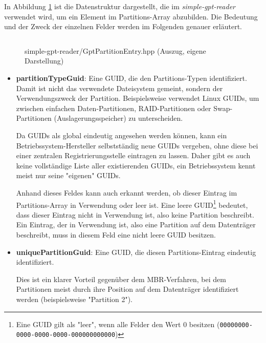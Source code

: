 In Abbildung \ref{fig:GptPartitionEntry.hpp} ist die Datenstruktur dargestellt, die im \textit{simple-gpt-reader} verwendet wird, um ein Element im Partitions-Array abzubilden.
Die Bedeutung und der Zweck der einzelnen Felder werden im Folgenden genauer erläutert.

\begin{figure}[ht]
    \inputminted[baselinestretch=1.2, tabsize=4, breaklines, frame=single]{c++}{content/code/simple-gpt-reader/GptPartitionEntry.hpp}
    
    \vspace{-0.5cm}

    \caption{simple-gpt-reader/GptPartitionEntry.hpp (Auszug, eigene Darstellung)}
    \label{fig:GptPartitionEntry.hpp}
\end{figure}

\begin{itemize}
    \item \textbf{partitionTypeGuid}:
    Eine GUID, die den Partitions-Typen identifiziert.
    Damit ist nicht das verwendete Dateisystem gemeint, sondern der Verwendungszweck der Partition.
    Beispielsweise verwendet Linux GUIDs, um zwischen einfachen Daten-Partitionen, RAID-Partitionen oder Swap-Partitionen (Auslagerungsspeicher) zu unterscheiden.
    
    Da GUIDs als global eindeutig angesehen werden können, kann ein Betriebssystem-Hersteller selbstständig neue GUIDs vergeben, ohne diese bei einer zentralen Registrierungsstelle eintragen zu lassen.
    Daher gibt es auch keine vollständige Liste aller existierenden GUIDs, ein Betriebssystem kennt meist nur seine "eigenen" GUIDs.

    \newpage
    Anhand dieses Feldes kann auch erkannt werden, ob dieser Eintrag im Partitions-Array in Verwendung oder leer ist.
    Eine leere GUID\footnote{
        Eine GUID gilt als "leer", wenn alle Felder den Wert 0 besitzen (\texttt{00000000-0000-0000-0000-000000000000})
    } bedeutet, dass dieser Eintrag nicht in Verwendung ist, also keine Partition beschreibt.
    Ein Eintrag, der in Verwendung ist, also eine Partition auf dem Datenträger beschreibt, muss in diesem Feld eine nicht leere GUID besitzen.

    \item \textbf{uniquePartitionGuid}:
    Eine GUID, die diesen Partitions-Eintrag eindeutig identifiziert.
    
    Dies ist ein klarer Vorteil gegenüber dem MBR-Verfahren, bei dem Partitionen meist durch ihre Position auf dem Datenträger identifiziert werden (beispielsweise "Partition 2").
    

\end{itemize}
